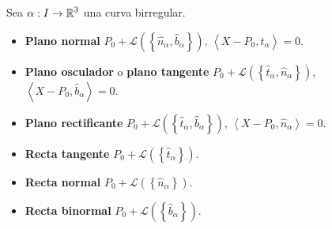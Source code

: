 \begin{definition}
Sea $\displaystyle \alpha : I \to \mathbb{R}^{3} $ una curva birregular. 
\begin{itemize}
	\item \textbf{Plano normal} $\displaystyle P_{0} + \mathcal{L}\left(\left\{\hat{n}_{\alpha }, \hat{b}_{\alpha }\right\}\right) $, $\displaystyle \left\langle X-P_{0}, \hat{t}_{\alpha } \right\rangle =0 $.
	\item \textbf{Plano osculador} o \textbf{plano tangente} $\displaystyle P_{0} + \mathcal{L}\left(\left\{\hat{t}_{\alpha}, \hat{n}_{\alpha }\right\}\right) $, $\displaystyle \left\langle X-P_{0}, \hat{b}_{\alpha} \right\rangle =0 $.
	\item \textbf{Plano rectificante} $\displaystyle P_{0} + \mathcal{L}\left(\left\{\hat{t}_{\alpha }, \hat{b}_{\alpha}\right\}\right) $, $\displaystyle \left\langle X-P_{0}, \hat{n}_{\alpha } \right\rangle =0 $. 
	\item \textbf{Recta tangente} $\displaystyle P_{0} + \mathcal{L}\left(\left\{\hat{t}_{\alpha }\right\}\right) $. 
	\item \textbf{Recta normal} $\displaystyle P_{0} + \mathcal{L}\left(\left\{\hat{n}_{\alpha }\right\}\right) $.
	\item \textbf{Recta binormal} $\displaystyle P_{0} + \mathcal{L}\left(\left\{\hat{b}_{\alpha }\right\}\right) $.
\end{itemize}
\end{definition}

